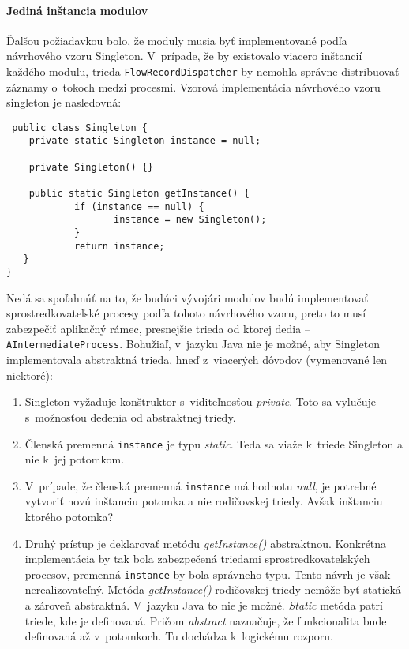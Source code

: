 \paragraph{Jediná inštancia modulov} \label{sec:singleton}
Ďalšou požiadavkou bolo, že moduly musia byť implementované podľa návrhového vzoru Singleton. V~prípade, že
by existovalo viacero inštancií každého modulu, trieda \verb|FlowRecordDispatcher| by nemohla správne 
distribuovať záznamy o~tokoch medzi procesmi. Vzorová implementácia návrhového
vzoru singleton je nasledovná:  
\begin{verbatim}
 public class Singleton {
    private static Singleton instance = null;
 
    private Singleton() {}
 
    public static Singleton getInstance() {
            if (instance == null) {
                   instance = new Singleton();
            }
            return instance;
   }
}
\end{verbatim}
Nedá sa spoľahnúť na to, že budúci vývojári modulov budú implementovať sprostredkovateľské procesy 
podľa tohoto návrhového vzoru, preto to musí zabezpečiť aplikačný rámec, presnejšie trieda od ktorej 
dedia -- \verb|AIntermediateProcess|.
Bohužiaľ, v~jazyku Java nie je možné, aby Singleton implementovala abstraktná trieda, hneď z~viacerých
dôvodov (vymenované len niektoré):
\begin{enumerate}
 \item Singleton vyžaduje konštruktor s~viditeľnosťou \emph{private}. Toto sa vylučuje s~možnosťou 
 dedenia od abstraktnej triedy.
 \item Členská premenná \verb|instance| je typu \emph{static}. Teda sa viaže k~triede Singleton a nie k~jej 
 potomkom.
 \item V~prípade, že členská premenná \verb|instance| má hodnotu \emph{null}, je potrebné vytvoriť novú inštanciu 
 potomka a nie rodičovskej triedy. Avšak inštanciu ktorého potomka?
 \item Druhý prístup je deklarovať metódu \emph{getInstance()} abstraktnou. Konkrétna implementácia 
 by tak bola zabezpečená triedami sprostredkovateľských procesov, premenná \verb|instance|
 by bola správneho typu. Tento návrh je však nerealizovateľný. 
 Metóda \emph{getInstance()} rodičovskej triedy nemôže byť statická a zároveň abstraktná. V~jazyku Java
 to nie je možné. 
 \emph{Static} metóda patrí triede, kde je definovaná. 
 Pričom \emph{abstract} naznačuje, že funkcionalita bude definovaná až v~potomkoch. Tu dochádza
k~logickému rozporu.
\end{enumerate}
